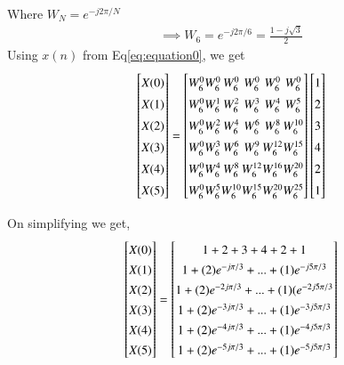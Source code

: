 \documentclass[journal,12pt,twocolumn]{IEEEtran}
\renewcommand\thesection{\arabic{section}}
\begin{document}
\begin{enumerate}[label=\thesection.\arabic*.,ref=\thesection.\theenumi]
Where $W_{N} = e^{-j2\pi/N}$
\begin{align}
\implies W_{6} = e^{-j2\pi/6} = \frac{1-j\sqrt{3}}{2}
\end{align}
\newline
Using $x(n)$ from Eq\eqref{eq:equation0}, we get
\begin{equation}
\renewcommand{\arraystretch}{1.45}
\setlength\arraycolsep{0.01pt}
\begin{bmatrix} 
X(0) \\ X(1) \\ X(2) \\ X(3) \\ X(4) \\ X(5) 
\end{bmatrix}
=
\begin{bmatrix}
W^{0}_{6} & W^{0}_{6} & W^{0}_{6} & W^{0}_{6} & W^{0}_{6} & W^{0}_{6}\\
W^{0}_{6} & W^{1}_{6} & W^{2}_{6} & W^{3}_{6} & W^{4}_{6} & W^{5}_{6}\\
W^{0}_{6} & W^{2}_{6} & W^{4}_{6} & W^{6}_{6} & W^{8}_{6} & W^{10}_{6}\\
W^{0}_{6} & W^{3}_{6} & W^{6}_{6} & W^{9}_{6} & W^{12}_{6} & W^{15}_{6}\\
W^{0}_{6} & W^{4}_{6} & W^{8}_{6} & W^{12}_{6} & W^{16}_{6} & W^{20}_{6}\\
W^{0}_{6} & W^{5}_{6} & W^{10}_{6} & W^{15}_{6} & W^{20}_{6} & W^{25}_{6} 
\end{bmatrix}
\begin{bmatrix}
1 \\ 2 \\ 3 \\ 4 \\ 2 \\ 1
\end{bmatrix}
\end{equation}


On simplifying we get,
\begin{align}
    \renewcommand{\arraystretch}{1.35}
    \begin{bmatrix} X(0) \\ X(1) \\ X(2) \\ X(3) \\ X(4) \\ X(5) \end{bmatrix}
=
\begin{bmatrix}
1 +2+3+4+2+1 \\ 1+ (2)e^{-j\pi /3} + ... + (1)e^{-j5\pi /3}\\ 1 + (2)e^{-2j\pi /3} + ... +(1)(e^{-2j5\pi /3}\\ 1 + (2)e^{-3j\pi /3} + ... + (1)e^{-3j5\pi /3}\\ 1 + (2)e^{-4j\pi /3} + ... + (1)e^{-4j5\pi /3}\\ 1 + (2)e^{-5j\pi /3} + ... + (1)e^{-5j5\pi /3}
\end{bmatrix}
\end{align}


\end{enumerate}
\end{document}
